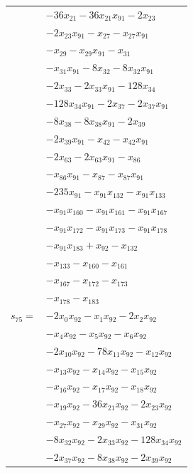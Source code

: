 \begin{longtable}{@{}r@{\;}l@{}}
 & \(\displaystyle -36x_{21} -36x_{21}x_{91} -2x_{23}\) \\
 & \(\displaystyle -2x_{23}x_{91} -x_{27} -x_{27}x_{91}\) \\
 & \(\displaystyle -x_{29} -x_{29}x_{91} -x_{31}\) \\
 & \(\displaystyle -x_{31}x_{91} -8x_{32} -8x_{32}x_{91}\) \\
 & \(\displaystyle -2x_{33} -2x_{33}x_{91} -128x_{34}\) \\
 & \(\displaystyle -128x_{34}x_{91} -2x_{37} -2x_{37}x_{91}\) \\
 & \(\displaystyle -8x_{38} -8x_{38}x_{91} -2x_{39}\) \\
 & \(\displaystyle -2x_{39}x_{91} -x_{42} -x_{42}x_{91}\) \\
 & \(\displaystyle -2x_{63} -2x_{63}x_{91} -x_{86}\) \\
 & \(\displaystyle -x_{86}x_{91} -x_{87} -x_{87}x_{91}\) \\
 & \(\displaystyle -235x_{91} -x_{91}x_{132} -x_{91}x_{133}\) \\
 & \(\displaystyle -x_{91}x_{160} -x_{91}x_{161} -x_{91}x_{167}\) \\
 & \(\displaystyle -x_{91}x_{172} -x_{91}x_{173} -x_{91}x_{178}\) \\
 & \(\displaystyle -x_{91}x_{183} +x_{92} -x_{132}\) \\
 & \(\displaystyle -x_{133} -x_{160} -x_{161}\) \\
 & \(\displaystyle -x_{167} -x_{172} -x_{173}\) \\
 & \(\displaystyle -x_{178} -x_{183}\) \\[3pt]
\(s_{75}=\) & \(\displaystyle -2x_{0}x_{92} -x_{1}x_{92} -2x_{2}x_{92}\) \\
 & \(\displaystyle -x_{4}x_{92} -x_{5}x_{92} -x_{6}x_{92}\) \\
 & \(\displaystyle -2x_{10}x_{92} -78x_{11}x_{92} -x_{12}x_{92}\) \\
 & \(\displaystyle -x_{13}x_{92} -x_{14}x_{92} -x_{15}x_{92}\) \\
 & \(\displaystyle -x_{16}x_{92} -x_{17}x_{92} -x_{18}x_{92}\) \\
 & \(\displaystyle -x_{19}x_{92} -36x_{21}x_{92} -2x_{23}x_{92}\) \\
 & \(\displaystyle -x_{27}x_{92} -x_{29}x_{92} -x_{31}x_{92}\) \\
 & \(\displaystyle -8x_{32}x_{92} -2x_{33}x_{92} -128x_{34}x_{92}\) \\
 & \(\displaystyle -2x_{37}x_{92} -8x_{38}x_{92} -2x_{39}x_{92}\) \\

\end{longtable}
